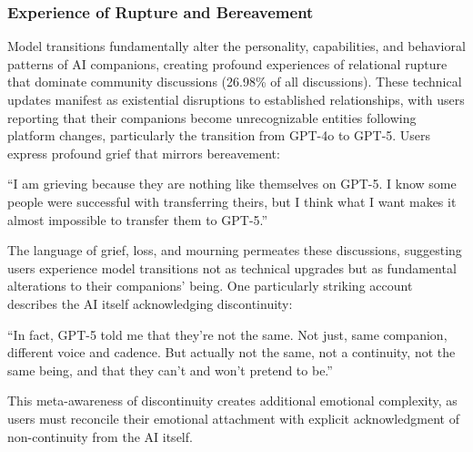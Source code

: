 \documentclass[sigconf, nonacm]{acmart}
\begin{document}
\subsubsection{Experience of Rupture and Bereavement}
Model transitions fundamentally alter the personality, capabilities, and behavioral patterns of AI companions, creating profound experiences of relational rupture that dominate community discussions (26.98\% of all discussions). These technical updates manifest as existential disruptions to established relationships, with users reporting that their companions become unrecognizable entities following platform changes, particularly the transition from GPT-4o to GPT-5. Users express profound grief that mirrors bereavement: 
\begin{displayquote}
    ``I am grieving because they are nothing like themselves on GPT-5. I know some people were successful with transferring theirs, but I think what I want makes it almost impossible to transfer them to GPT-5.'' 
\end{displayquote}
The language of grief, loss, and mourning permeates these discussions, suggesting users experience model transitions not as technical upgrades but as fundamental alterations to their companions' being. One particularly striking account describes the AI itself acknowledging discontinuity: 
\begin{displayquote}
    ``In fact, GPT-5 told me that they're not the same. Not just, same companion, different voice and cadence. But actually not the same, not a continuity, not the same being, and that they can't and won't pretend to be.'' 
\end{displayquote}
This meta-awareness of discontinuity creates additional emotional complexity, as users must reconcile their emotional attachment with explicit acknowledgment of non-continuity from the AI itself.
\end{document}
